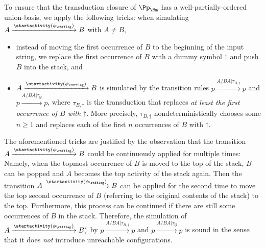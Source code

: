 To ensure that the transduction closure of $\Pp_\Mm$  has a well-partially-ordered union-basis, we
apply the following tricks: when simulating $A\xrightarrow{\startactivity(\phi_{\rtfflag})}B$ with $A \neq B$,
\begin{itemize}
\item instead of moving the first occurrence of $B$ to the beginning of the input string, we replace the first occurrence of $B$ with a dummy symbol $\dag$ and push $B$ into the stack, and
%
\item $A\xrightarrow{\startactivity(\phi_{\rtfflag})}B$ is simulated by the transition rules $p \xrightarrow{A / BA | \tau_{B, \dag}} p$ and  $p \xrightarrow{A / BA | \tau_{\not B}} p$, where $\tau_{B, \dag}$ is the transduction that replaces \emph{at least the first occurrence of $B$ with $\dag$}. More precisely, $\tau_{B, \dag}$ nondeterministically chooses some $n \ge 1$ and replaces each of the first $n$ occurrences of $B$ with $\dag$.
\end{itemize}
The aforementioned tricks are justified by the observation that the transition $A\xrightarrow{\startactivity(\phi_{\rtfflag})}B$ could be continuously applied for multiple times: Namely, when the topmost occurrence of $B$ is moved to the top of the stack, $B$ can be popped and $A$ becomes the top activity of the stack again. Then the transition $A\xrightarrow{\startactivity(\phi_{\rtfflag})}B$ can be applied for the second time to move the top second occurrence of $B$  (referring to the original contents of the stack) to the top. Furthermore, this process can be continued if there are still some occurrences of $B$ in the stack. Therefore, the simulation of $A\xrightarrow{\startactivity(\phi_{\rtfflag})}B)$ by $p \xrightarrow{A / BA | \tau_{B, \dag}} p$ and  $p \xrightarrow{A / BA | \tau_{\not B}} p$ is sound in the sense that it does \emph{not} introduce unreachable configurations.


